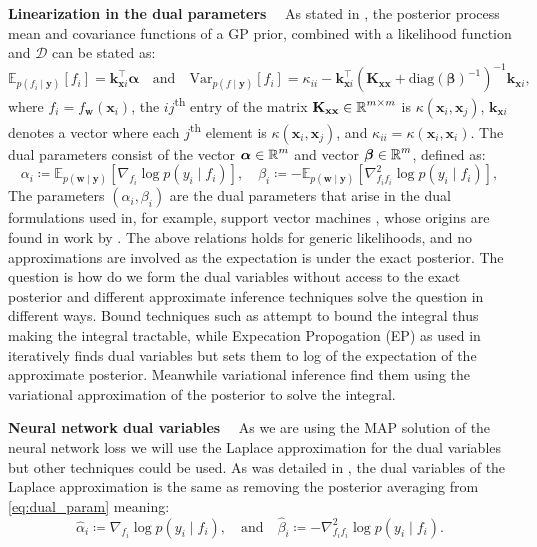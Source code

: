 \documentclass{article}
\renewcommand{\paragraph}[1]{{\bf #1}~~}
\newcommand{\dataset}{\ensuremath{\mathcal{D}}}
\newcommand{\weights}{\ensuremath{\mathbf{w}}}
\newcommand{\mathbold}[1]{\bm{#1}}
\newcommand{\mbf}[1]{\mathbf{#1}}
\newcommand{\valpha}[0]{\mathbold{\alpha}}
\newcommand{\vbeta}[0]{\mathbold{\beta}}
\newcommand{\diag}{\text{{diag}}}
\newcommand{\vx}{\mbf{x}}
\newcommand{\vy}{\mbf{y}}
\newcommand{\vw}{\mbf{w}}
\newcommand{\MKxx}{\mbf{K}_{\mbf{x}\mbf{x}}}
\newcommand{\vk}{\mbf{k}}
\newcommand{\myexpect}{\mathbb{E}}
\begin{document}
\paragraph{Linearization in the dual parameters}
As stated in \citet[Lemma~1]{csato2002sparse}, the posterior process mean and covariance functions of a GP prior, combined with a likelihood function and $\dataset$ can be stated as:
\begin{equation}  \label{eq:gp_pred}
 \myexpect_{p(f_i \mid\vy)}[f_i] = \vk_{\vx i}^\top \valpha \quad \text{and} \quad
\mathrm{Var}_{p(f\mid\vy)}[f_i] = \kappa_{ii} - \vk_{\vx i}^\top ( \MKxx + \diag(\vbeta)^{-1})^{-1} \vk_{\vx i},
\end{equation}
where $f_i = f_\weights(\vx_i)$, the $ij$\textsuperscript{th} entry of the matrix $\MKxx \in \R^{m \times m}$ is $\kappa(\vx_i,\vx_j)$, $\vk_{\vx i}$ denotes a vector where each $j$\textsuperscript{th} element is $\kappa(\vx_i, \vx_j)$, and $\kappa_{ii} = \kappa(\vx_i, \vx_i)$.  The dual parameters consist of the vector $\valpha \in \R^{m}$ and vector $\vbeta \in \R^{m}$, defined as:
\begin{equation}
\label{eq:dual_param}
\alpha_i \coloneqq \myexpect_{p(\vw \mid \vy)}[\nabla_{f_i}\log p(y_i \mid f_i)],  \quad
\beta_i \coloneqq - \myexpect_{p(\vw \mid \vy)}[\nabla^2_{f_i f_i}\log p(y_i \mid f_i)] ,
\end{equation}
%
The parameters $(\alpha_i, \beta_i)$ are the dual parameters that arise in the dual formulations used in, for example, support vector machines \citep{cortes1995support}, whose origins are found in work by \citet{kimeldorf1971some}. The above relations holds for generic likelihoods, and no approximations are involved as the expectation is under the exact posterior. The question is how do we form the dual variables without access to the exact posterior and different approximate inference techniques solve the question in different ways. Bound techniques such as \citet{jaakkola1997variational} attempt to bound the integral thus making the integral tractable, while Expecation Propogation (EP) as used in \citet{csato2002sparse} iteratively finds dual variables but sets them to log of the expectation of the approximate posterior. Meanwhile variational inference  \cite{khan2017conjugate, adam2021dual} find them using the variational approximation of the posterior to solve the integral.

\paragraph{Neural network dual variables}
As we are using the MAP solution of the neural network loss we will use the Laplace approximation for the dual variables but other techniques could be used. As was detailed in \cite{wilkinson2023bayes, rasmussen2006gaussian}, the dual variables of the Laplace approximation is the same as removing the posterior averaging from \cref{eq:dual_param} meaning:
\begin{equation}
\label{eq:dual_param_laplace}
\hat{\alpha}_i \coloneqq \nabla_{f_i}\log p(y_i \mid f_i),  \quad \text{and} \quad
\hat{\beta}_i \coloneqq - \nabla^2_{f_i f_i}\log p(y_i \mid f_i).
\end{equation}
\end{document}
